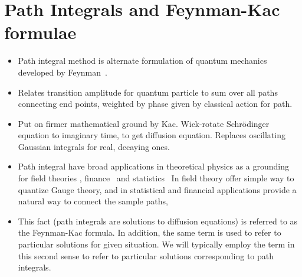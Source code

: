 \chapter{Path Integrals and Feynman-Kac formulae}

\begin{itemize}
  \item Path integral method is alternate formulation of quantum mechanics developed by 
    Feynman~\cite{Feynman1948,Feynman1965}.  
  \item Relates transition amplitude for quantum particle to sum over all paths connecting
    end points, weighted by phase given by classical action for path.  
  \item Put on firmer mathematical ground by Kac.  
    Wick-rotate Schr\"odinger equation to imaginary time, to get diffusion equation.
    Replaces oscillating Gaussian integrals for real, decaying ones.
  \item Path integral have broad applications in theoretical physics as a grounding for field theories
    \cite{Brown1994}, finance~\cite{Glasserman2006} and statistics~\cite{Durret1996, KaratsazShreve1991.}
    In field theory offer simple way to quantize Gauge theory, and in statistical and financial 
    applications provide a natural way to connect the sample paths, 
  \item This fact (path integrals are solutions to diffusion equations) is referred to as the 
    Feynman-Kac formula.  
    In addition, the same term is used to refer to particular solutions for given situation.
    We will typically employ the term in this second sense to refer to particular
    solutions corresponding to path integrals.  
\end{itemize}

